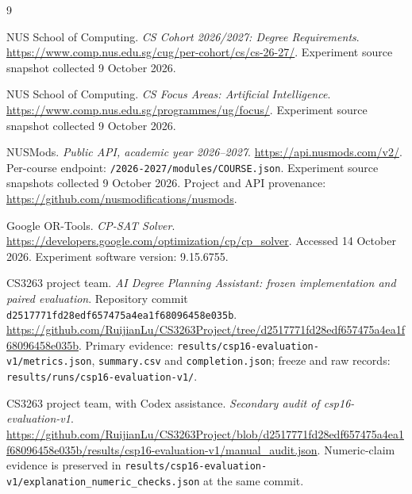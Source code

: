 \documentclass[11pt,a4paper]{article}
\newcommand{\code}[1]{\texttt{#1}}
\begin{document}
\clearpage
{}
\begin{thebibliography}{9}
\raggedright

NUS School of Computing.
\emph{CS Cohort 2026/2027: Degree Requirements}.
\url{https://www.comp.nus.edu.sg/cug/per-cohort/cs/cs-26-27/}.
Experiment source snapshot collected 9 October 2026.

NUS School of Computing.
\emph{CS Focus Areas: Artificial Intelligence}.
\url{https://www.comp.nus.edu.sg/programmes/ug/focus/}.
Experiment source snapshot collected 9 October 2026.

NUSMods.
\emph{Public API, academic year 2026--2027}.
\url{https://api.nusmods.com/v2/}.
Per-course endpoint:
\code{/2026-2027/modules/COURSE.json}.
Experiment source snapshots collected 9 October 2026.
Project and API provenance:
\url{https://github.com/nusmodifications/nusmods}.

Google OR-Tools.
\emph{CP-SAT Solver}.
\url{https://developers.google.com/optimization/cp/cp_solver}.
Accessed 14 October 2026. Experiment software version: 9.15.6755.

CS3263 project team.
\emph{AI Degree Planning Assistant: frozen implementation and paired evaluation}.
Repository commit \code{d2517771fd28edf657475a4ea1f68096458e035b}.
\url{https://github.com/RuijianLu/CS3263Project/tree/d2517771fd28edf657475a4ea1f68096458e035b}.
Primary evidence: \code{results/csp16-evaluation-v1/metrics.json},
\code{summary.csv} and \code{completion.json};
freeze and raw records: \code{results/runs/csp16-evaluation-v1/}.

CS3263 project team, with Codex assistance.
\emph{Secondary audit of csp16-evaluation-v1}.
\url{https://github.com/RuijianLu/CS3263Project/blob/d2517771fd28edf657475a4ea1f68096458e035b/results/csp16-evaluation-v1/manual_audit.json}.
Numeric-claim evidence is preserved in
\code{results/csp16-evaluation-v1/explanation\_numeric\_checks.json}
at the same commit.

\end{thebibliography}
\end{document}
